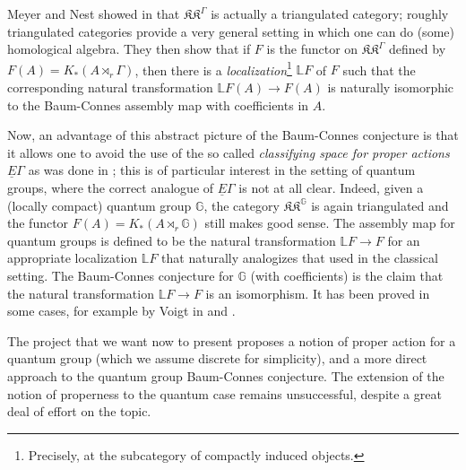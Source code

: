 Meyer and Nest showed in \cite{MeyerNest} that $\mathfrak{KK}^\Gamma$ is actually a triangulated category; roughly triangulated categories provide a very general setting in which one can do (some) homological algebra.  They then show that if $F$ is the functor on $\mathfrak{KK}^\Gamma$ defined by $F(A)= K_*(A\rtimes_r \Gamma)$, then there is a \emph{localization}\footnote{Precisely, at the subcategory of compactly induced objects.} $\mathbb{L}F$ of $F$ such that the corresponding natural transformation $\mathbb L F(A) \rightarrow F(A)$ is naturally isomorphic to the Baum-Connes assembly map with coefficients in $A$. 

Now, an advantage of this abstract picture of the Baum-Connes conjecture is that it allows one to avoid the use of the so called \emph{classifying space for proper actions}  $\underline E \Gamma$ as was done in \cite{BaumConnesHigson}; this is of particular interest in the setting of quantum groups, where the correct analogue of $\underline E \Gamma$ is not at all clear.  Indeed, given a (locally compact) quantum group $\mathbb G$, the category $\mathfrak{KK}^{\mathbb G}$ is again triangulated and the functor $F(A)= K_*(A\rtimes_r \mathbb G)$ still makes good sense. The assembly map for quantum groups is defined to be the natural transformation $\mathbb L F\rightarrow F$ for an appropriate localization $\mathbb{L}F$ that naturally analogizes that used in the classical setting. The Baum-Connes conjecture for $\mathbb{G}$ (with coefficients) is the claim that the natural transformation $\mathbb L F\rightarrow F$ is an isomorphism. It has been proved in some cases, for example by Voigt in \cite{Voigt1} and \cite{Voigt2}. 

The project that we want now to present proposes a notion of proper action for a quantum group (which we assume discrete for simplicity), and  a more direct approach to the quantum group Baum-Connes conjecture.  The extension of the notion of properness to the quantum case remains unsuccessful, despite a great deal of effort on the topic.

 
